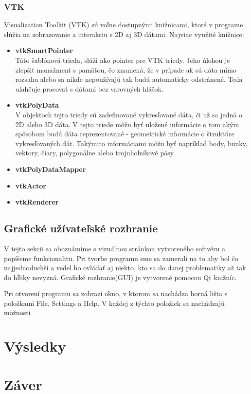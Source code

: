 \documentclass[a4paper,11pt,twoside]{article}%
\begin{document}
\subsubsection{VTK}

Visualization Toolkit (VTK) sú voľne dostupnými knižnicami, ktoré v programe slúžia na zobrazovanie a interakciu s 2D aj 3D dátami. Najviac využité knižnice:

\begin{itemize}
\item \textbf{vtkSmartPointer} \\
Táto šablónová trieda, slúži ako pointer pre VTK triedy. Jeho úlohou je zlepšiť manažment s pamäťou, čo znamená, že v prípade ak sú dáta mimo rozsahu alebo sa nikde nepoužívajú tak budú automaticky odstránené. Teda uľahčuje pracovať s dátami bez varovných hlášok.

\item \textbf{vtkPolyData} \\
V objektoch tejto triedy sú zadefinované vykresľované dáta, či už sa jedná o 2D alebo 3D dáta. V tejto triede môžu byť uložené informácie o tom akým spôsobom budú dáta reprezentované - geometrické informácie o štruktúre vykresľovaných dát. Takýmito informáciami môžu byť napríklad body, bunky, vektory, čiary, polygonálne alebo trojuholníkové pásy.

\item \textbf{vtkPolyDataMapper} \\
\item \textbf{vtkActor} \\
\item \textbf{vtkRenderer} \\
\end{itemize}

\subsection{Grafické užívateľské rozhranie}

V tejto sekcii sa oboznámime s vizuálnou stránkou vytvoreného softvéru a popíšeme funkcionalitu. Pri tvorbe programu sme sa zamerali na to aby bol čo najjednoduchší a vedel ho ovládať aj niekto, kto sa do danej problematiky až tak do hĺbky nevyzná. Grafické rozhranie(GUI) je vytvorené pomocou Qt knižníc.

Pri otvorení programu sa zobrazí okno, v ktorom sa nachádza horná lišta s položkami File, Settings a Help. V každej z týchto položiek sa nachádzajú možnosti




\newpage
\section{Výsledky}

\newpage
\section{Záver}

\newpage
\begin{thebibliography}{50}
\end{thebibliography}
\end{document}
